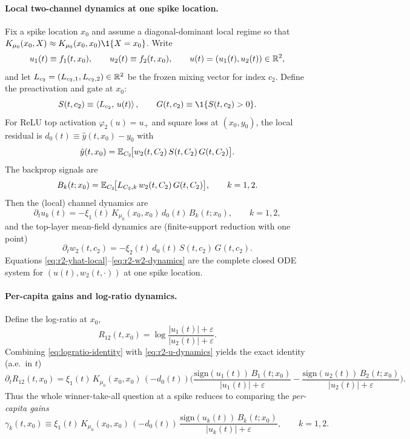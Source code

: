 \paragraph{Local two-channel dynamics at one spike location.}
Fix a spike location $x_0$ and assume a diagonal-dominant local regime so that $K_{\mu_0}(x_0,X)\approx K_{\mu_0}(x_0,x_0)\1\{X=x_0\}$.
Write
\[
u_1(t)\equiv f_1(t,x_0),\qquad u_2(t)\equiv f_2(t,x_0),\qquad u(t)=(u_1(t),u_2(t))\in\mathbb{R}^2,
\]
and let $L_{c_2}=(L_{c_2,1},L_{c_2,2})\in\mathbb{R}^2$ be the frozen mixing vector for index $c_2$.
Define the preactivation and gate at $x_0$:
\[
S(t,c_2)\equiv \ip{L_{c_2}}{u(t)},\qquad G(t,c_2)\equiv \1\{S(t,c_2)>0\}.
\]
For ReLU top activation $\varphi_2(u)=u_+$ and square loss at $(x_0,y_0)$, the local residual is $d_0(t)\equiv \hat y(t,x_0)-y_0$ with
\begin{equation}\label{eq:r2-yhat-local}
\hat y(t,x_0)=\mathbb{E}_{C_2}\!\big[w_2(t,C_2)\,S(t,C_2)\,G(t,C_2)\big].
\end{equation}
The backprop signals are
\begin{equation}\label{eq:r2-B-local}
B_k(t;x_0)=\mathbb{E}_{C_2}\!\big[L_{C_2,k}\,w_2(t,C_2)\,G(t,C_2)\big],\qquad k=1,2.
\end{equation}
Then the (local) channel dynamics are
\begin{equation}\label{eq:r2-u-dynamics}
\partial_t u_k(t)=-\xi_1(t)\,K_{\mu_0}(x_0,x_0)\,d_0(t)\,B_k(t;x_0),\qquad k=1,2,
\end{equation}
and the top-layer mean-field dynamics are (finite-support reduction with one point)
\begin{equation}\label{eq:r2-w2-dynamics}
\partial_t w_2(t,c_2)=-\xi_2(t)\,d_0(t)\,S(t,c_2)\,G(t,c_2).
\end{equation}
Equations \eqref{eq:r2-yhat-local}--\eqref{eq:r2-w2-dynamics} are the complete closed ODE system for $(u(t),w_2(t,\cdot))$ at one spike location.

\paragraph{Per-capita gains and log-ratio dynamics.}
Define the log-ratio at $x_0$,
\[
R_{12}(t,x_0)=\log\frac{|u_1(t)|+\varepsilon}{|u_2(t)|+\varepsilon}.
\]
Combining \eqref{eq:logratio-identity} with \eqref{eq:r2-u-dynamics} yields the exact identity (a.e.\ in $t$)
\begin{equation}\label{eq:r2-logratio-local}
\partial_t R_{12}(t,x_0)
=\xi_1(t)\,K_{\mu_0}(x_0,x_0)\,(-d_0(t))
\Big(\frac{\mathrm{sign}(u_1(t))\,B_1(t;x_0)}{|u_1(t)|+\varepsilon}-\frac{\mathrm{sign}(u_2(t))\,B_2(t;x_0)}{|u_2(t)|+\varepsilon}\Big).
\end{equation}
Thus the whole winner-take-all question at a spike reduces to comparing the \emph{per-capita gains}
\[
\gamma_k(t,x_0)\equiv \xi_1(t)\,K_{\mu_0}(x_0,x_0)\,(-d_0(t))\,\frac{\mathrm{sign}(u_k(t))\,B_k(t;x_0)}{|u_k(t)|+\varepsilon},\qquad k=1,2.
\]

